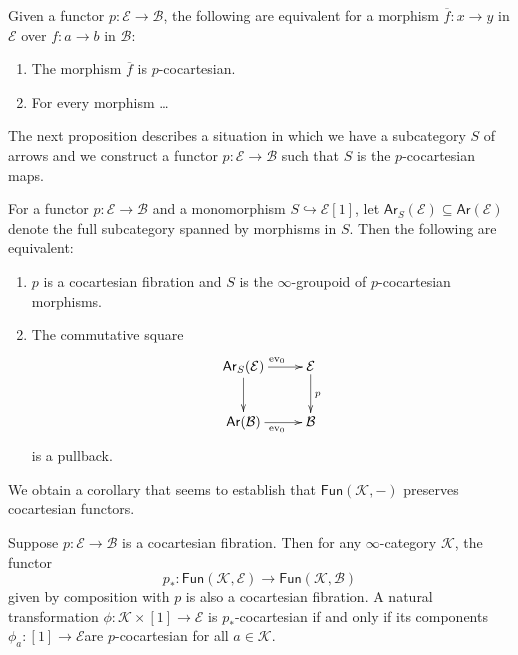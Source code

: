 \begin{lemma}
\label{lemma-p-cocartesian-characterization}
Given a functor $p:\mathcal{E}\to\mathcal{B}$,
the following are equivalent for a morphism
$\overline{f}:x\to y$ in $\mathcal{E}$ 
over $f:a \to b$ in $\mathcal{B}$:
\begin{enumerate}
\item The morphism $\overline{f}$ is $p$-cocartesian.
\item For every morphism  …
\end{enumerate}
\end{lemma}

\noindent
The next proposition describes a situation
in which we have a subcategory $S$ of arrows 
and we construct a functor $p:\mathcal{E} \to \mathcal{B}$ 
such that $S$ is the $p$-cocartesian maps.

\begin{proposition}
\label{proposition-subcategory-of-arrows}
For a functor $p:\mathcal{E} \to \mathcal{B}$ and a monomorphism
$S\hookrightarrow \mathcal{E}[1]$, let 
$\mathsf{Ar}_S(\mathcal{E})\subseteq \mathsf{Ar}(\mathcal{E})$ 
denote the full subcategory spanned by morphisms in $S$.
Then the following are equivalent:
\begin{enumerate}
\item $p$ is a cocartesian fibration and  $S$ is the
$\infty$-groupoid of $p$-cocartesian morphisms.
\item The commutative square
$$
\xymatrix{
\mathsf{Ar}_S(\mathcal{E})\ar[r]^{\text{ev}_0}\ar[d]&\mathcal{E}\ar[d]^{p}\\
\mathsf{Ar}(\mathcal{B})\ar[r]_{\text{ev}_0}&\mathcal{B}
}
$$
is a pullback.
\end{enumerate}
\end{proposition}

We obtain a corollary that seems to establish
that $\mathsf{Fun}(\mathcal{K},-)$ preserves
cocartesian functors.

\begin{lemma}
\label{lemma-covariant-fun-preserves-cocartesian}
Suppose $p:\mathcal{E}\to \mathcal{B}$ is a cocartesian fibration.
Then for any $\infty$-category $\mathcal{K}$, the functor
$$
p_*:\mathsf{Fun}(\mathcal{K},\mathcal{E})
\to\mathsf{Fun}(\mathcal{K},\mathcal{B})
$$
given by composition with $p$ is also a cocartesian fibration.
A natural transformation $\phi:\mathcal{K}\times[1]\to\mathcal{E}$ 
is $p_*$-cocartesian if and only if its components
$\phi_a:[1]\to\mathcal{E}$are $p$-cocartesian for all $a \in \mathcal{K}$.
\end{lemma}

